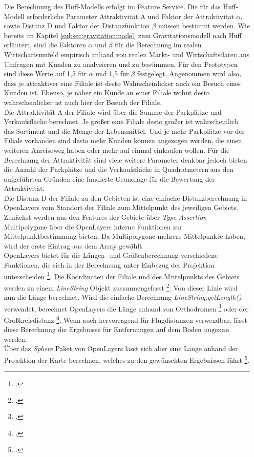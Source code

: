 Die Berechnung des Huff-Modells erfolgt im Feature Service.
Die für das Huff-Modell erforderliche Parameter Attraktivität A und Faktor der Attraktivität $\alpha$, sowie Distanz D und Faktor der Distanzfunktion $\beta$ müssen bestimmt werden.
Wie bereits im Kapitel \ref{subsec:gravitationmodel} zum Gravitationsmodell nach Huff erläutert, sind die Faktoren $\alpha$ und $\beta$ für die Berechnung im realen Wirtschaftsumfeld empirisch anhand von realen Markt- und Wirtschaftsdaten aus Umfragen mit Kunden zu analysieren und zu bestimmen.
Für den Prototypen sind diese Werte auf 1,5 für $\alpha$ und 1,5 für $\beta$ festgelegt.
Angenommen wird also, dass je attraktiver eine Filiale ist desto Wahrscheinlicher auch ein Besuch eines Kunden ist.
Ebenso, je näher ein Kunde an einer Filiale wohnt desto wahrscheinlicher ist auch hier der Besuch der Filiale.\\
Die Attraktivität A der Filiale wird über die Summe der Parkplätze und Verkaufsfläche berechnet.
Je größer eine Filiale desto größer ist wahrscheinlich das Sortiment und die Menge der Lebensmittel.
Und je mehr Parkplätze vor der Filiale vorhanden sind desto mehr Kunden können angezogen werden, die einen weiteren Anreiseweg haben oder mehr auf einmal einkaufen wollen.
Für die Berechnung der Attraktivität sind viele weitere Parameter denkbar jedoch bieten die Anzahl der Parkplätze und die Verkaufsfläche in Quadratmetern aus den aufgeführten Gründen eine fundierte Grundlage für die Bewertung der Attraktivität.\\
Die Distanz D der Filiale zu den Gebieten ist eine einfache Distanzberechnung in OpenLayers vom Standort der Filiale zum Mittelpunkt des jeweiligen Gebiets.
Zunächst werden aus den Features der Gebiete über \emph{Type Assertion} Multipolygone über die OpenLayers interne Funktionen zur Mittelpunktbestimmung bieten.
Da Multipolygone mehrere Mittelpunkte haben, wird der erste Eintrag aus dem Array gewählt.\\
OpenLayers bietet für die Längen- und Größenberechnung verschiedene Funktionen, die sich in der Berechnung unter Einbezug der Projektion unterscheiden \footcite{openlayers_measure_example}.
Die Koordinaten der Filiale und des Mittelpunkts des Gebiets werden zu einem \emph{LineString} Objekt zusammengefasst \footcite{openlayers_linestring}.
Von dieser Linie wird nun die Länge berechnet.
Wird die einfache Berechnung \emph{LineString.getLength()} verwendet, berechnet OpenLayers die Länge anhand von Orthodromen \footcite{orthodrome_frassek} oder der Großkreisdistanz \footcite{great_circle_distance}.
Wenn auch hervorragend für Flugdistanzen verwendbar, lässt diese Berechnung die Ergebnisse für Entfernungen auf dem Boden ungenau werden.\\
Über das \emph{Sphere} Paket von OpenLayers lässt sich aber eine Länge anhand der Projektion der Karte berechnen, welches zu den gewünschten Ergebnissen führt \footcite{openlayers_sphere}.

